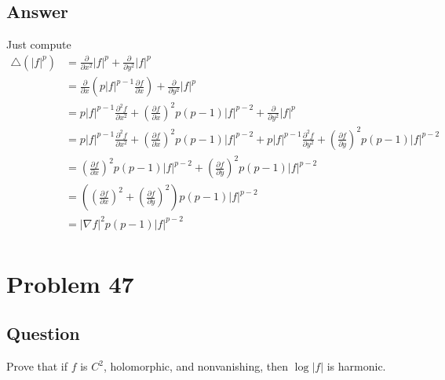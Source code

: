 \documentclass[11pt]{article}
\begin{document}
\subsection{Answer}
Just compute
{\allowdisplaybreaks
\begin{align*}
\triangle(|f|^p)&= \frac{\partial}{\partial x^2} |f|^p + \frac{\partial}{\partial y^2} |f|^p\\
&= \frac{\partial}{\partial x} \left( p |f|^{p-1} \frac{\partial f}{\partial x} \right) + \frac{\partial}{\partial y^2} |f|^p\\
&= p |f|^{p-1} \frac{\partial^2 f}{\partial x^2 } + \left(\frac{\partial f}{\partial x}\right)^2p(p-1)|f|^{p-2}  + \frac{\partial}{\partial y^2} |f|^p\\
&= p |f|^{p-1} \frac{\partial^2 f}{\partial x^2 } + \left(\frac{\partial f}{\partial x}\right)^2p(p-1)|f|^{p-2}  +  p |f|^{p-1} \frac{\partial^2 f}{\partial y^2 } + \left(\frac{\partial f}{\partial y}\right)^2p(p-1)|f|^{p-2} \\
&= \left(\frac{\partial f}{\partial x}\right)^2p(p-1)|f|^{p-2}  + \left(\frac{\partial f}{\partial y}\right)^2p(p-1)|f|^{p-2} \\
&= \left( \left(\frac{\partial f}{\partial x}\right)^2  + \left(\frac{\partial f}{\partial y}\right)^2 \right) p(p-1)|f|^{p-2} \\
&=|\nabla{f}|^2 p(p-1)|f|^{p-2} \\
\end{align*}}

\section{Problem  47}
\subsection{Question}
Prove that if $f$ is $C^2$, holomorphic, and nonvanishing, then $\log|f|$ is harmonic.
\end{document}
